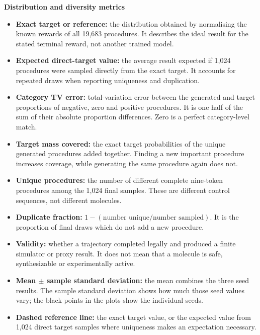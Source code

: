 \documentclass{article}
\begin{document}
\textbf{Distribution and diversity metrics}
\begin{itemize}
    \item \textbf{Exact target or reference:} the distribution obtained by normalising the known rewards of all 19,683 procedures. It describes the ideal result for the stated terminal reward, not another trained model.
    \item \textbf{Expected direct-target value:} the average result expected if 1,024 procedures were sampled directly from the exact target. It accounts for repeated draws when reporting uniqueness and duplication.
    \item \textbf{Category TV error:} total-variation error between the generated and target proportions of negative, zero and positive procedures. It is one half of the sum of their absolute proportion differences. Zero is a perfect category-level match.
    \item \textbf{Target mass covered:} the exact target probabilities of the unique generated procedures added together. Finding a new important procedure increases coverage, while generating the same procedure again does not.
    \item \textbf{Unique procedures:} the number of different complete nine-token procedures among the 1,024 final samples. These are different control sequences, not different molecules.
    \item \textbf{Duplicate fraction:} $1-(\text{number unique}/\text{number sampled})$. It is the proportion of final draws which do not add a new procedure.
    \item \textbf{Validity:} whether a trajectory completed legally and produced a finite simulator or proxy result. It does not mean that a molecule is safe, synthesizable or experimentally active.
    \item \textbf{Mean $\pm$ sample standard deviation:} the mean combines the three seed results. The sample standard deviation shows how much those seed values vary; the black points in the plots show the individual seeds.
    \item \textbf{Dashed reference line:} the exact target value, or the expected value from 1,024 direct target samples where uniqueness makes an expectation necessary.
\end{itemize}
\end{document}
